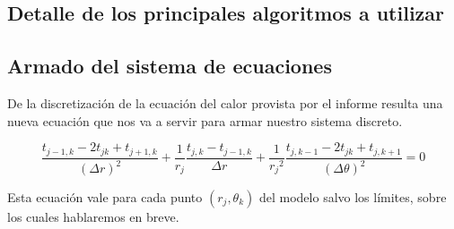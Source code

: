 
\subsection{Detalle de los principales algoritmos a utilizar}

\subsection{Armado del sistema de ecuaciones}
De la discretización de la ecuación del calor provista por el informe resulta una nueva ecuación que nos va a servir para armar nuestro sistema discreto.

\begin{equation}\label{calor}
\frac{t_{j-1,k}-2t_{jk}+t_{j+1,k}}{(\Delta r)^2}+\frac{1}{r_j}\frac{t_{j,k}-t_{j-1,k}}{\Delta r}+\frac{1}{{r_j}^2}\frac{t_{j,k-1}-2t_{jk}+t_{j,k+1}}{(\Delta \theta)^2} = 0 
\end{equation}

Esta ecuación vale para cada punto $(r_j, \theta_k)$ del modelo salvo los límites, sobre los cuales hablaremos en breve.

